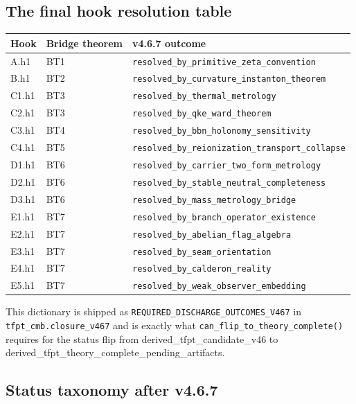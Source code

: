 \documentclass[11pt,a4paper]{article}
\begin{document}
\subsection{The final hook resolution table}

\begin{center}
\renewcommand{\arraystretch}{1.13}
\begin{tabular}{@{}lll@{}}
\toprule
\textbf{Hook} & \textbf{Bridge theorem} & \textbf{v4.6.7 outcome} \\
\midrule
A.h1   & BT1 & \texttt{resolved\_by\_primitive\_zeta\_convention} \\
B.h1   & BT2 & \texttt{resolved\_by\_curvature\_instanton\_theorem} \\
C1.h1  & BT3 & \texttt{resolved\_by\_thermal\_metrology} \\
C2.h1  & BT3 & \texttt{resolved\_by\_qke\_ward\_theorem} \\
C3.h1  & BT4 & \texttt{resolved\_by\_bbn\_holonomy\_sensitivity} \\
C4.h1  & BT5 & \texttt{resolved\_by\_reionization\_transport\_collapse} \\
D1.h1  & BT6 & \texttt{resolved\_by\_carrier\_two\_form\_metrology} \\
D2.h1  & BT6 & \texttt{resolved\_by\_stable\_neutral\_completeness} \\
D3.h1  & BT6 & \texttt{resolved\_by\_mass\_metrology\_bridge} \\
E1.h1  & BT7 & \texttt{resolved\_by\_branch\_operator\_existence} \\
E2.h1  & BT7 & \texttt{resolved\_by\_abelian\_flag\_algebra} \\
E3.h1  & BT7 & \texttt{resolved\_by\_seam\_orientation} \\
E4.h1  & BT7 & \texttt{resolved\_by\_calderon\_reality} \\
E5.h1  & BT7 & \texttt{resolved\_by\_weak\_observer\_embedding} \\
\bottomrule
\end{tabular}
\end{center}

This dictionary is shipped as
\texttt{REQUIRED\_DISCHARGE\_OUTCOMES\_V467} in
\texttt{tfpt\_cmb.closure\_v467} and is exactly what
\texttt{can\_flip\_to\_theory\_complete()} requires for the status
flip from \textsf{derived\_tfpt\_candidate\_v46} to
\textsf{derived\_tfpt\_theory\_complete\_pending\_artifacts}.

\subsection{Status taxonomy after v4.6.7}
\end{document}
